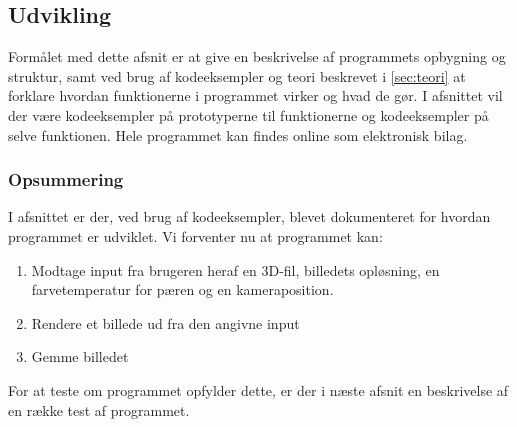 \subsection{Udvikling}
Formålet med dette afsnit er at give en beskrivelse af programmets opbygning og struktur, samt ved brug af kodeeksempler og teori beskrevet i \ref{sec:teori} at forklare hvordan funktionerne i programmet virker og hvad de gør. I afsnittet vil der være kodeeksempler på prototyperne til funktionerne og kodeeksempler på selve funktionen. Hele programmet kan findes online som elektronisk bilag.







\subsubsection*{Opsummering}
\label{sec:krav_til_kode}
I afsnittet er der, ved brug af kodeeksempler, blevet dokumenteret for hvordan programmet er udviklet. Vi forventer nu at programmet kan:

\begin{enumerate}
    \item Modtage input fra brugeren heraf en 3D-fil, billedets opløsning, en farvetemperatur for pæren og en kameraposition.
    \item Rendere et billede ud fra den angivne input
    \item Gemme billedet
\end{enumerate}

For at teste om programmet opfylder dette, er der i næste afsnit en beskrivelse af en række test af programmet.